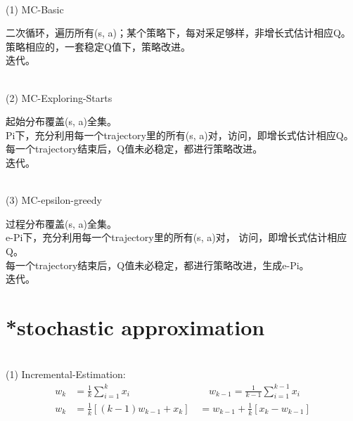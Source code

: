 \documentclass{article}
\begin{document}
~ \\[3pt]
(1) MC-Basic
~ \\[3pt]
\begin{CJK}{UTF8}{gbsn}
    二次循环，遍历所有(s, a)；某个策略下，每对采足够样，非增长式估计相应Q。 \\[3pt]
    策略相应的，一套稳定Q值下，策略改进。 \\[3pt]
    迭代。 \\[3pt]
\end{CJK}


~ \\[3pt]
(2) MC-Exploring-Starts
~ \\[3pt]
\begin{CJK}{UTF8}{gbsn}
    起始分布覆盖(s, a)全集。 \\[3pt]
    Pi下，充分利用每一个trajectory里的所有(s, a)对，访问，即增长式估计相应Q。 \\[3pt]
    每一个trajectory结束后，Q值未必稳定，都进行策略改进。 \\[3pt]
    迭代。 \\[3pt]
\end{CJK}


~ \\[3pt]
(3) MC-epsilon-greedy
~ \\[3pt]
\begin{CJK}{UTF8}{gbsn}
    过程分布覆盖(s, a)全集。 \\[3pt]
    e-Pi下，充分利用每一个trajectory里的所有(s, a)对，
    访问，即增长式估计相应Q。 \\[3pt]
    每一个trajectory结束后，Q值未必稳定，都进行策略改进，生成e-Pi。 \\[3pt]
    迭代。 \\[3pt]
\end{CJK}


\newpage
\section*{*stochastic approximation}


~ \\[3pt]
(1) Incremental-Estimation: 
\begin{align*}
    w_{k}   &= \frac {1} {k} \sum_{i=1}^{k} x_{i} 
            \qquad \qquad \qquad \qquad 
    w_{k-1}  = \frac {1} {k-1} \sum_{i=1}^{k-1} x_{i} \\[3pt]
    w_{k}   &= \frac {1} {k} \left[ (k-1)w_{k-1} + x_{k} \right] 
            \quad = w_{k-1} + \frac {1} {k} 
            \left[ x_{k} - w_{k-1} \right] 
\end{align*}
\end{document}
